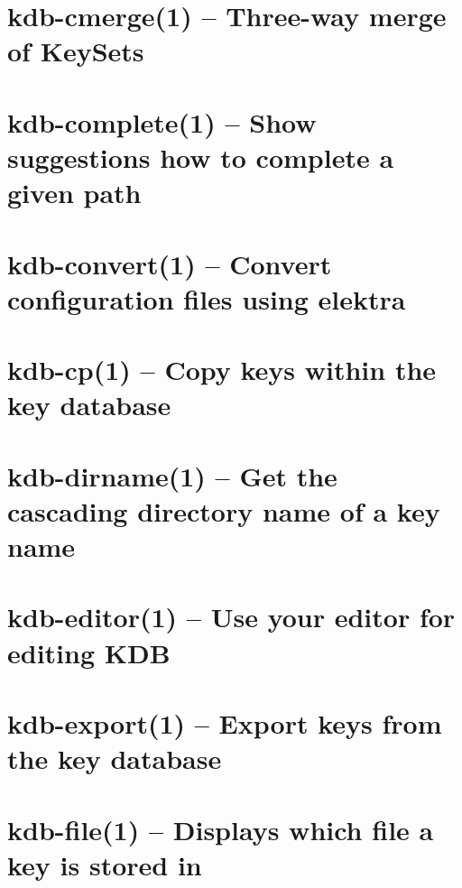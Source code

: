 \let\mypdfximage\pdfximage\def\pdfximage{\immediate\mypdfximage}\documentclass[twoside]{book}
\newcommand{\+}{\discretionary{\mbox{\scriptsize$\hookleftarrow$}}{}{}}
\begin{document}
\chapter{kdb-\/cmerge(1) -- Three-\/way merge of Key\+Sets}
\label{doc_help_kdb-cmerge_md}

\chapter{kdb-\/complete(1) -- Show suggestions how to complete a given path}
\label{doc_help_kdb-complete_md}

\chapter{kdb-\/convert(1) -- Convert configuration files using elektra}
\label{doc_help_kdb-convert_md}

\chapter{kdb-\/cp(1) -- Copy keys within the key database}
\label{doc_help_kdb-cp_md}

\chapter{kdb-\/dirname(1) -- Get the cascading directory name of a key name}
\label{doc_help_kdb-dirname_md}

\chapter{kdb-\/editor(1) -- Use your editor for editing KDB}
\label{doc_help_kdb-editor_md}

\chapter{kdb-\/export(1) -- Export keys from the key database}
\label{doc_help_kdb-export_md}

\chapter{kdb-\/file(1) -- Displays which file a key is stored in}
\label{doc_help_kdb-file_md}

\end{document}
